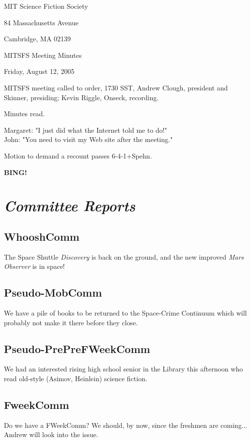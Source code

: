 \documentclass[10pt]{article}
\newcommand{\bing}{{\bf BING!} }
\newcommand{\goto}[1]{\bing \vskip 12pt \section*{{\em{#1}}}}
\begin{document}
\begin{center}

MIT Science Fiction Society

84 Massachusetts Avenue

Cambridge, MA 02139

\vspace{12pt}

MITSFS Meeting Minutes

Friday, August 12, 2005

\end{center}

\vspace{18pt}

\setlength{\parskip}{6pt}

\noindent
MITSFS meeting called to order, 1730 SST, Andrew Clough, president and
Skinner, presiding; Kevin Riggle,  Onseck, recording.

Minutes read.

Margaret: "I just did what the Internet told me to do!"\\
John: "You need to visit my Web site after the meeting."

Motion to demand a recount passes 6-4-1+Spehn.

\goto{Committee Reports}
\subsection*{WhooshComm}
The Space Shuttle \emph{Discovery} is back on the ground, and the new improved \emph{Mars Observer}
is in space!

\subsection*{Pseudo-MobComm}
We have a pile of books to be returned to the Space-Crime Continuum which will probably not make it there before they close.

\subsection*{Pseudo-PrePreFWeekComm}
We had an interested rising high school senior in the Library this afternoon who read old-style (Asimov, Heinlein)
science fiction.  

\subsection*{FweekComm}
Do we have a FWeekComm?  We should, by now, since the freshmen are coming...  Andrew will look into the issue.
\end{document}
